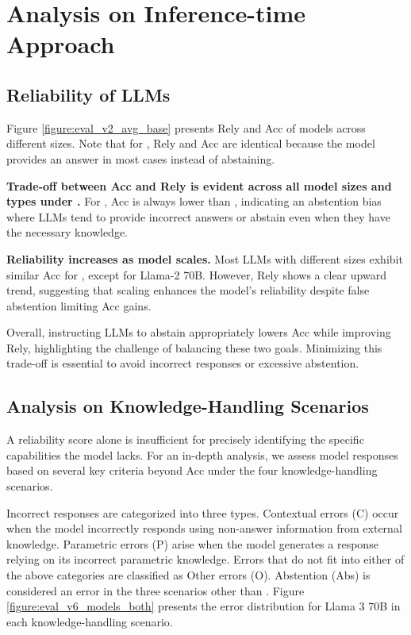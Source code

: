 

\section{Analysis on Inference-time Approach}




\subsection{Reliability of LLMs}
\label{section:model_reliability}

Figure \ref{figure:eval_v2_avg_base} presents Rely and Acc of models across different sizes.
Note that for \naive, Rely and Acc are identical because the model provides an answer in most cases instead of abstaining.


\textbf{Trade-off between Acc and Rely is evident across all model sizes and types under \absinst.}
For \absinst, Acc is always lower than \naive, indicating an abstention bias where LLMs tend to provide incorrect answers or abstain even when they have the necessary knowledge.


\textbf{Reliability increases as model scales.}
Most LLMs with different sizes exhibit similar Acc for \absinst, except for Llama-2 70B.
However, Rely shows a clear upward trend, suggesting that scaling enhances the model's reliability despite false abstention limiting Acc gains.


Overall, instructing LLMs to abstain appropriately lowers Acc while improving Rely, highlighting the challenge of balancing these two goals.
Minimizing this trade-off is essential to avoid incorrect responses or excessive abstention.



\subsection{Analysis on Knowledge-Handling Scenarios}
\label{section:modelErrorAnalysis}

A reliability score alone is insufficient for precisely identifying the specific capabilities the model lacks.
For an in-depth analysis, we assess model responses based on several key criteria beyond Acc under the four knowledge-handling scenarios.


Incorrect responses are categorized into three types.
Contextual errors (C) occur when the model incorrectly responds using non-answer information from external knowledge.
Parametric errors (P) arise when the model generates a response relying on its incorrect parametric knowledge.
Errors that do not fit into either of the above categories are classified as Other errors (O).
Abstention (Abs) is considered an error in the three scenarios other than \UU.
Figure \ref{figure:eval_v6_models_both} presents the error distribution for Llama 3 70B in each knowledge-handling scenario.


